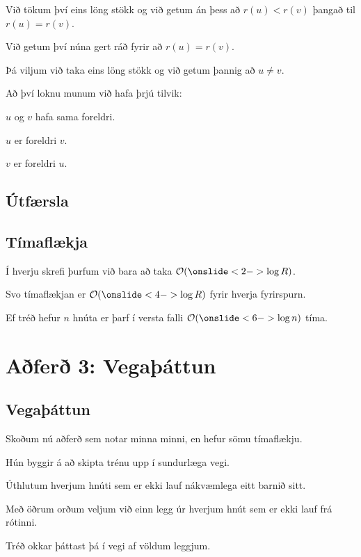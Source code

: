 {
    {
        \item<1-> Við tökum því eins löng stökk og við getum án þess að $r(u) < r(v)$ þangað til $r(u) = r(v)$.
        \item<2-> Við getum því núna gert ráð fyrir að $r(u) = r(v)$.
        \item<3-> Þá viljum við taka eins löng stökk og við getum þannig að $u \neq v$.
        \item<4-> Að því loknu munum við hafa þrjú tilvik:
        {
            \item<5-> $u$ og $v$ hafa sama foreldri.
            \item<6-> $u$ er foreldri $v$.
            \item<7-> $v$ er foreldri $u$.
        }
    }
}

\subsection{Útfærsla}
{
}

\subsection{Tímaflækja}
{
    {
        \item<1-> Í hverju skrefi þurfum við bara að taka $\mathcal{O}(\onslide<2->{\log R})$.
        \item<3-> Svo tímaflækjan er $\mathcal{O}(\onslide<4->{\log R})$ fyrir hverja fyrirspurn.
        \item<5-> Ef tréð hefur $n$ hnúta er þarf í versta falli $\mathcal{O}(\onslide<6->{\log n})$ tíma.
    }
}

\section{Aðferð 3: Vegaþáttun}
\subsection{Vegaþáttun}
{
    {
        \item<1-> Skoðum nú aðferð sem notar minna minni, en hefur sömu tímaflækju.
        \item<2-> Hún byggir á að skipta trénu upp í sundurlæga vegi.
        \item<3-> Úthlutum hverjum hnúti sem er ekki lauf nákvæmlega eitt barnið sitt.
        \item<4-> Með öðrum orðum veljum við einn legg úr hverjum hnút sem er ekki lauf frá rótinni.
        \item<5-> Tréð okkar þáttast þá í vegi af völdum leggjum.
    }
}


